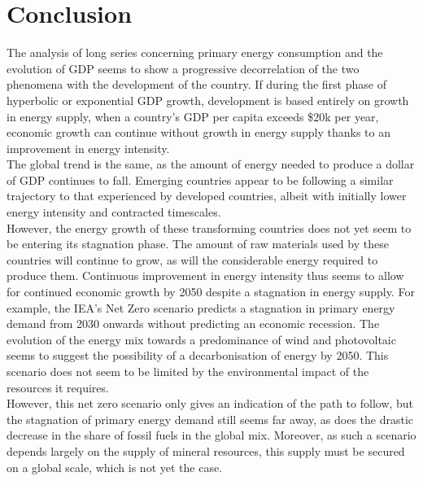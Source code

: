 \documentclass[conference]{IEEEtran}
\begin{document}
\section{Conclusion}
The analysis of long series concerning primary energy consumption and the evolution of GDP seems to show a progressive decorrelation of the two phenomena with the development of the country. If during the first phase of hyperbolic or exponential GDP growth, development is based entirely on growth in energy supply, when a country's GDP per capita exceeds \$20k per year, economic growth can continue without growth in energy supply thanks to an improvement in energy intensity. 
\\
The global trend is the same, as the amount of energy needed to produce a dollar of GDP continues to fall. 
Emerging countries appear to be following a similar trajectory to that experienced by developed countries, albeit with initially lower energy intensity and contracted timescales. 
\\
However, the energy growth of these transforming countries does not yet seem to be entering its stagnation phase. The amount of raw materials used by these countries will continue to grow, as will the considerable energy required to produce them.
Continuous improvement in energy intensity thus seems to allow for continued economic growth by 2050 despite a stagnation in energy supply. For example, the IEA's Net Zero scenario predicts a stagnation in primary energy demand from 2030 onwards without predicting an economic recession. The evolution of the energy mix towards a predominance of wind and photovoltaic seems to suggest the possibility of a decarbonisation of energy by 2050. This scenario does not seem to be limited by the environmental impact of the resources it requires. 
\\
However, this net zero scenario only gives an indication of the path to follow, but the stagnation of primary energy demand still seems far away, as does the drastic decrease in the share of fossil fuels in the global mix. Moreover, as such a scenario depends largely on the supply of mineral resources, this supply must be secured on a global scale, which is not yet the case.




\end{document}
